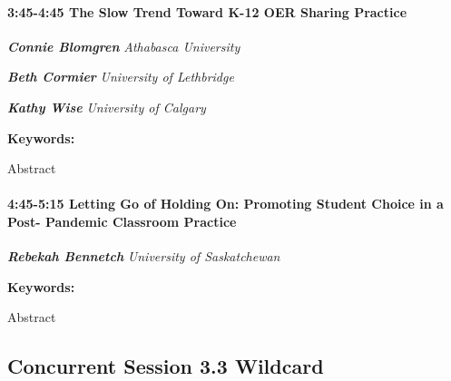\documentclass[
]{book}
\begin{document}
\begin{session}
\hypertarget{the-slow-trend-toward-k-12-oer-sharing-practice}{%
\paragraph*{\texorpdfstring{3:45-4:45 \textbar{} \textbf{The Slow Trend
Toward K-12 OER Sharing} \textbar{}
Practice}{3:45-4:45 \textbar{} The Slow Trend Toward K-12 OER Sharing \textbar{} Practice}}\label{the-slow-trend-toward-k-12-oer-sharing-practice}}

\textbf{\emph{Connie Blomgren}} \textbar{} \emph{Athabasca University}

\textbf{\emph{Beth Cormier}} \textbar{} \emph{University of Lethbridge}

\textbf{\emph{Kathy Wise}} \textbar{} \emph{University of Calgary}

\textbf{Keywords:}

Abstract
\end{session}

\begin{session}
\hypertarget{letting-go-of-holding-on-promoting-student-choice-in-a-post--pandemic-classroom-practice}{%
\paragraph*{\texorpdfstring{4:45-5:15 \textbar{} \textbf{Letting Go of
Holding On: Promoting Student Choice in a Post- Pandemic Classroom}
\textbar{}
Practice}{4:45-5:15 \textbar{} Letting Go of Holding On: Promoting Student Choice in a Post- Pandemic Classroom \textbar{} Practice}}\label{letting-go-of-holding-on-promoting-student-choice-in-a-post--pandemic-classroom-practice}}

\textbf{\emph{Rebekah Bennetch}} \textbar{} \emph{University of
Saskatchewan}

\textbf{Keywords:}

Abstract
\end{session}

\hypertarget{concurrent-session-3.3-wildcard}{%
\subsection*{Concurrent Session 3.3 \textbar{} Wildcard}\label{concurrent-session-3.3-wildcard}}
\end{document}
